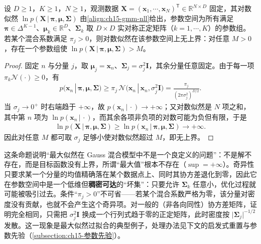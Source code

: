 \documentclass[../../main.tex]{subfiles}
\begin{document}
\begin{proposition}[似然函数的奇异性]\label{proposition:ch15-似然奇异性}
设 $D\geqslant1$，$K\geqslant1$，$N\geqslant1$，观测数据 $\bm{X}=(\bm{x}_1,\cdots,\bm{x}_N)^{\mathsf T}\in\mathbb{R}^{N\times D}$ 固定，其对数似然 $\ln p(\bm{X}\,|\,\bm{\pi},\bm{\mu},\bm{\Sigma})$ 由\eqref{align:ch15-gmm-nll}给出，参数空间为所有满足 $\bm{\pi}\in\Delta^{K-1}$、$\bm{\mu}_k\in\mathbb{R}^{D}$、$\bm{\Sigma}_k$ 取 $D\times D$ 实对称正定矩阵（$k=1,\cdots,K$）的参数组。若某个混合系数满足 $\pi_j>0$，则对数似然在该参数空间上无上界：对任意 $M>0$，存在一个参数组使 $\ln p(\bm{X}\,|\,\bm{\pi},\bm{\mu},\bm{\Sigma})>M$。
\end{proposition}
\begin{proof}
固定 $n$ 与分量 $j$，取 $\bm{\mu}_j=\bm{x}_n$、$\bm{\Sigma}_j=\sigma_j^2\bm{I}$，其余分量任意固定。由于每一项 $\pi_k\mathcal{N}(\cdot)\geqslant0$，有
\begin{align*}
p(\bm{x}_n\,|\,\bm{\pi},\bm{\mu},\bm{\Sigma})
\geqslant\pi_j\,\mathcal{N}\big(\bm{x}_n\,|\,\bm{x}_n,\sigma_j^2\bm{I}\big)
=\frac{\pi_j}{(2\pi\sigma_j^2)^{D/2}}.
\end{align*}
当 $\sigma_j\to0^{+}$ 时右端趋于 $+\infty$，故 $p(\bm{x}_n\,|\,\cdot)\to+\infty$；又对数似然是 $N$ 项之和，其中第 $n$ 项为 $\ln p(\bm{x}_n\,|\,\cdot)$，而其余各项非负项的对数可能为负但有限，于是
\begin{align*}
\ln p(\bm{X}\,|\,\bm{\pi},\bm{\mu},\bm{\Sigma})\geqslant\ln p(\bm{x}_n\,|\,\bm{\pi},\bm{\mu},\bm{\Sigma})\longrightarrow+\infty.
\end{align*}
因此对任意 $M$ 都可取 $\sigma_j$ 足够小使对数似然超过 $M$，即无上界。
\end{proof}

\begin{remark}
这条命题说明“最大似然在 Gauss 混合模型中不是一个良定义的问题”：不是解不存在，而是目标函数没有上界，所谓“最大值”根本不存在（$\sup=+\infty$）。奇异性只要求某一个分量的均值精确落在某个数据点上、同时其协方差退化到零，因此它在参数空间中是一个低维但\textbf{稠密可达}的“坏集”：只要允许 $\bm{\Sigma}_k$ 任意小，优化过程就可能被吸引过去。条件“$\pi_j>0$”不可省——若某个混合系数严格为零，该分量对密度没有贡献，也就不会产生这个奇异项。对一般的（非各向同性）协方差矩阵，证明完全相同，只需把 $\sigma_j^2\bm{I}$ 换成一个行列式趋于零的正定矩阵，此时密度按 $\lvert\bm{\Sigma}_j\rvert^{-1/2}$ 发散。这一现象是最大似然过拟合的典型例子，处理办法见下文的启发式重置与参数先验（\cref{subsection:ch15-参数先验}）。
\end{remark}
\end{document}
